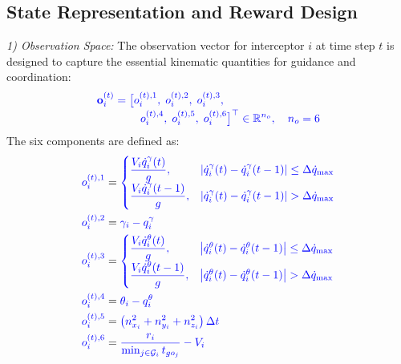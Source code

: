 \documentclass[lettersize,journal]{IEEEtran}
\newcommand{\hladd}[1]{{\color{blue}#1}}
\begin{document}
\subsection{State Representation and Reward Design}
\label{subsec:state_reward}

\emph{1) Observation Space:} The observation vector for interceptor $i$ at time step $t$ is designed to capture the essential kinematic quantities for guidance and coordination:
\begin{equation}
\label{eq:observation_space}
\hladd{\begin{aligned}
\mathbf{o}_i^{(t)}={}&\bigl[o_i^{(t),1},\;o_i^{(t),2},\;o_i^{(t),3},\\[-2pt]
&\quad o_i^{(t),4},\;o_i^{(t),5},\;o_i^{(t),6}\bigr]^\top\in\mathbb{R}^{n_o},\quad n_o=6
\end{aligned}}
\end{equation}
\hladd{The six components are defined as:}
\begin{align}
\hladd{o_i^{(t),1}} &=
\hladd{\begin{cases}
\dfrac{V_i \dot{q}_i^{\gamma}(t)}{g}, &
\left|\dot{q}_i^{\gamma}(t) - \dot{q}_i^{\gamma}(t-1)\right| \leq \Delta \dot{q}_{\max}
\\[0pt]
\dfrac{V_i \dot{q}_i^{\gamma}(t-1)}{g}, &
\left|\dot{q}_i^{\gamma}(t) - \dot{q}_i^{\gamma}(t-1)\right| > \Delta \dot{q}_{\max}
\end{cases}}
\label{eq:o1}
\\[0pt]
\hladd{o_i^{(t),2}} &= \hladd{\gamma_i-q_i^{\gamma}}
\label{eq:o2}
\\[0pt]
\hladd{o_i^{(t),3}} &=
\hladd{\begin{cases}
\dfrac{V_i \dot{q}_i^{\theta}(t)}{g}, &
\left|\dot{q}_i^{\theta}(t) - \dot{q}_i^{\theta}(t-1)\right| \leq \Delta \dot{q}_{\max}
\\[0pt]
\dfrac{V_i \dot{q}_i^{\theta}(t-1)}{g}, &
\left|\dot{q}_i^{\theta}(t) - \dot{q}_i^{\theta}(t-1)\right| > \Delta \dot{q}_{\max}
\end{cases}}
\label{eq:o3}
\\[0pt]
\hladd{o_i^{(t),4}} &= \hladd{\theta_i-q_i^{\theta}}
\label{eq:o4}
\\[0pt]
\hladd{o_i^{(t),5}} &= \hladd{\left(n_{x_i}^2+n_{y_i}^2+n_{z_i}^2\right)\Delta t}
\label{eq:o5}
\\[0pt]
\hladd{o_i^{(t),6}} &= \hladd{\frac{r_i}{\min_{j \in \mathcal{G}_i} t_{go_j}}-V_i}
\label{eq:o6}
\end{align}
\end{document}
